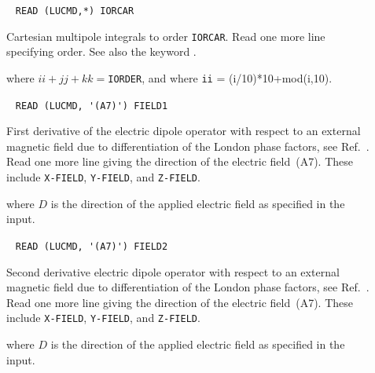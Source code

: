 \begin{description}
\item[]\verb| |\newline
\verb|READ (LUCMD,*) IORCAR|

Cartesian multipole integrals to order
\verb|IORCAR|. Read one more
line specifying order. See also the keyword .

where $ii+jj+kk =$\verb|IORDER|, and where \verb|ii| = (i/10)*10+mod(i,10).

\item[]\verb| |\newline
\verb|READ (LUCMD, '(A7)') FIELD1|

First derivative of the  electric dipole operator
with respect to an external magnetic field
due to differentiation of the London phase
factors, see Ref.~\cite{arthkrabmjpjjcp102}. Read one more line giving
the direction of the electric field~(A7). These 
include \verb|X-FIELD|, \verb|Y-FIELD|, and \verb|Z-FIELD|.

where $D$ is the direction of the applied electric field as specified in
the input.

\item[]\verb| |\newline
\verb|READ (LUCMD, '(A7)') FIELD2|

Second derivative electric dipole operator
with respect to an external magnetic field due
to differentiation of
the London phase factors, see Ref.~\cite{arthkrabmjpjjcp102}. Read one
more line giving the direction of the electric
field~(A7). These
include \verb|X-FIELD|, \verb|Y-FIELD|, and \verb|Z-FIELD|.

where $D$ is the direction of the applied electric field as specified in
the input.


\end{description}
